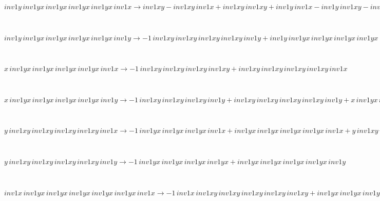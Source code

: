 \begin{minipage}{6in}
$
inv1y\,
 inv1yx\,
 inv1yx\,
 inv1yx\,
 inv1yx\,
 inv1x\rightarrow inv1xy - inv1xy\,
 inv1x + inv1xy\,
 inv1xy + inv1y\,
 inv1x - inv1y\,
 inv1xy - inv1xy\,
 inv1xy\,
 inv1x + inv1xy\,
 inv1xy\,
 inv1xy + inv1y\,
 inv1xy\,
 inv1x - inv1y\,
 inv1xy\,
 inv1xy - inv1xy\,
 inv1xy\,
 inv1xy\,
 inv1x + inv1xy\,
 inv1xy\,
 inv1xy\,
 inv1xy + inv1y\,
 inv1xy\,
 inv1xy\,
 inv1x - inv1y\,
 inv1xy\,
 inv1xy\,
 inv1xy - inv1xy\,
 inv1xy\,
 inv1xy\,
 inv1xy\,
 inv1x + inv1y\,
 inv1xy\,
 inv1xy\,
 inv1xy\,
 inv1x - inv1y\,
 inv1xy\,
 inv1xy\,
 inv1xy\,
 inv1xy + inv1y\,
 inv1xy\,
 inv1xy\,
 inv1xy\,
 inv1xy\,
 inv1x
$
\end{minipage}\medskip \\
\begin{minipage}{6in}
$
inv1y\,
 inv1yx\,
 inv1yx\,
 inv1yx\,
 inv1yx\,
 inv1y\rightarrow -1\,
 inv1xy\,
 inv1xy\,
 inv1xy\,
 inv1xy\,
 inv1y + inv1y\,
 inv1yx\,
 inv1yx\,
 inv1yx\,
 inv1yx + inv1y\,
 inv1xy\,
 inv1xy\,
 inv1xy\,
 inv1xy\,
 inv1y
$
\end{minipage}\medskip \\
\begin{minipage}{6in}
$
x\,
 inv1yx\,
 inv1yx\,
 inv1yx\,
 inv1yx\,
 inv1x\rightarrow -1\,
 inv1xy\,
 inv1xy\,
 inv1xy\,
 inv1xy + inv1xy\,
 inv1xy\,
 inv1xy\,
 inv1xy\,
 inv1x
$
\end{minipage}\medskip \\
\begin{minipage}{6in}
$
x\,
 inv1yx\,
 inv1yx\,
 inv1yx\,
 inv1yx\,
 inv1y\rightarrow -1\,
 inv1xy\,
 inv1xy\,
 inv1xy\,
 inv1y + inv1xy\,
 inv1xy\,
 inv1xy\,
 inv1xy\,
 inv1y + x\,
 inv1yx\,
 inv1yx\,
 inv1yx\,
 inv1yx
$
\end{minipage}\medskip \\
\begin{minipage}{6in}
$
y\,
 inv1xy\,
 inv1xy\,
 inv1xy\,
 inv1xy\,
 inv1x\rightarrow -1\,
 inv1yx\,
 inv1yx\,
 inv1yx\,
 inv1x + inv1yx\,
 inv1yx\,
 inv1yx\,
 inv1yx\,
 inv1x + y\,
 inv1xy\,
 inv1xy\,
 inv1xy\,
 inv1xy
$
\end{minipage}\medskip \\
\begin{minipage}{6in}
$
y\,
 inv1xy\,
 inv1xy\,
 inv1xy\,
 inv1xy\,
 inv1y\rightarrow -1\,
 inv1yx\,
 inv1yx\,
 inv1yx\,
 inv1yx + inv1yx\,
 inv1yx\,
 inv1yx\,
 inv1yx\,
 inv1y
$
\end{minipage}\medskip \\
\begin{minipage}{6in}
$
inv1x\,
 inv1yx\,
 inv1yx\,
 inv1yx\,
 inv1yx\,
 inv1yx\,
 inv1x\rightarrow -1\,
 inv1x\,
 inv1xy\,
 inv1xy\,
 inv1xy\,
 inv1xy\,
 inv1xy + inv1yx\,
 inv1yx\,
 inv1yx\,
 inv1yx\,
 inv1yx\,
 inv1x + inv1x\,
 inv1xy\,
 inv1xy\,
 inv1xy\,
 inv1xy\,
 inv1xy\,
 inv1x
$
\end{minipage}\medskip \\

